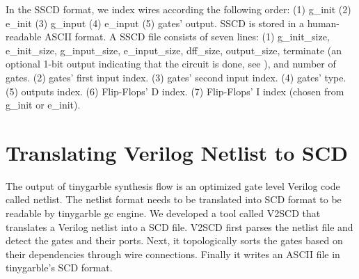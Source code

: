 In the SSCD format, we index wires according the following order: (1) g\_init (2) e\_init (3) g\_input (4) e\_input (5) gates' output.
SSCD is stored in a human-readable ASCII format.
A SSCD file consists of seven lines: (1) g\_init\_size, e\_init\_size, g\_input\_size, e\_input\_size, dff\_size, output\_size, terminate (an optional 1-bit output indicating that the circuit is done, see ), and number of gates. (2) gates' first input index. (3) gates' second input index. (4) gates' type. (5) outputs index. (6) Flip-Flops' D index. (7) Flip-Flops' I index (chosen from g\_init or e\_init).

\section{Translating Verilog Netlist to SCD}\label{sec:engine-v2sscd}
The output of \gls{tinygarble} synthesis flow is an optimized gate level Verilog code called netlist.
The netlist format needs to be translated into SCD format to be readable by \gls{tinygarble} \acrshort{gc} engine.
We developed a tool called V2SCD that translates a Verilog netlist into a SCD file.
V2SCD first parses the netlist file and detect the gates and their ports.
Next, it topologically sorts the gates based on their dependencies through wire connections.
Finally it writes an ASCII file in \gls{tinygarble}'s SCD format.


